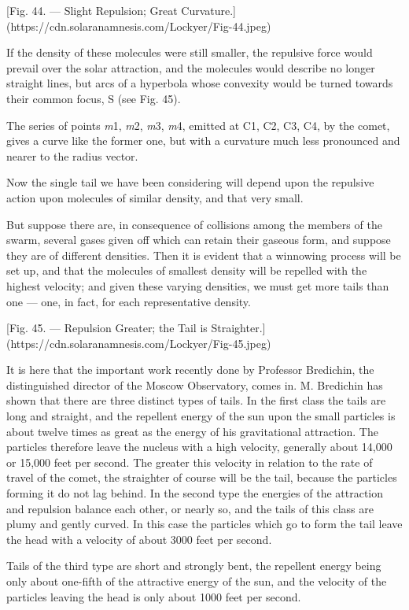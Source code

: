 \documentclass[a4paper, 12pt, oneside, polutonikogreek, english]{article}
\begin{document}
[Fig. 44. --- Slight Repulsion; Great Curvature.](https://cdn.solaranamnesis.com/Lockyer/Fig-44.jpeg)

If the density of these molecules were still smaller, the repulsive force would prevail over the solar attraction, and the molecules would describe no longer straight lines, but arcs of a hyperbola whose convexity would be turned towards their common focus, S (see Fig. 45).

The series of points \emph{m}1, \emph{m}2, \emph{m}3, \emph{m}4, emitted at C1, C2, C3, C4, by the comet, gives a curve like the former one, but with a curvature much less pronounced and nearer to the radius vector.

Now the single tail we have been considering will depend upon the repulsive action upon molecules of similar density, and that very small.

But suppose there are, in consequence of collisions among the members of the swarm, several gases given off which can retain their gaseous form, and suppose they are of different densities. Then it is evident that a winnowing process will be set up, and that the molecules of smallest density will be repelled with the highest velocity; and given these varying densities, we must get more tails than one --- one, in fact, for each representative density.

[Fig. 45. --- Repulsion Greater; the Tail is Straighter.](https://cdn.solaranamnesis.com/Lockyer/Fig-45.jpeg)

It is here that the important work recently done by Professor Bredichin, the distinguished director of the Moscow Observatory, comes in. M. Bredichin has shown that there are three distinct types of tails. In the first class the tails are long and straight, and the repellent energy of the sun upon the small particles is about twelve times as great as the energy of his gravitational attraction. The particles therefore leave the nucleus with a high velocity, generally about 14,000 or 15,000 feet per second. The greater this velocity in relation to the rate of travel of the comet, the straighter of course will be the tail, because the particles forming it do not lag behind. In the second type the energies of the attraction and repulsion balance each other, or nearly so, and the tails of this class are plumy and gently curved. In this case the particles which go to form the tail leave the head with a velocity of about 3000 feet per second.

Tails of the third type are short and strongly bent, the repellent energy being only about one-fifth of the attractive energy of the sun, and the velocity of the particles leaving the head is only about 1000 feet per second.
\end{document}
